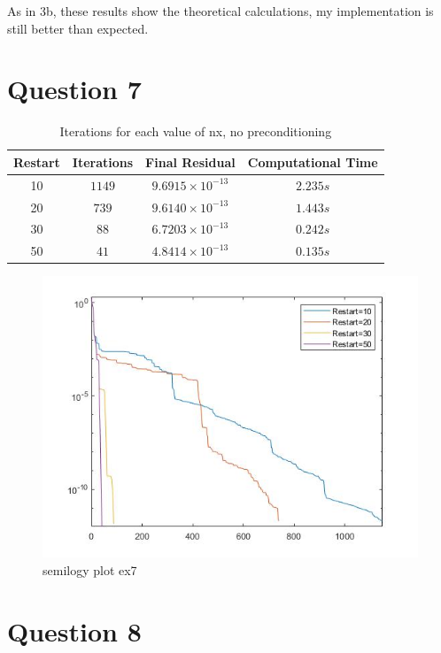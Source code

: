 \documentclass[a4paper, 11pt]{article}
\begin{document}
		As in 3b, these results show the theoretical calculations, my implementation is still better than expected.
		
		
		
		\section*{Question 7}
		
		\begin{table}[H]
			\centering
			\begin{tabular}{c|c|c|c}
				\textbf{Restart} &  \textbf{Iterations} 	& \textbf{Final Residual} 		& \textbf{Computational Time} 	\\ \hline
				10			& 			$1149$ 		& $ 9.6915 \times 10^{-13} $ 	& $ 2.235 s $	\\ \hline	
				20			& 			$739$		& $ 9.6140 \times 10^{-13} $	& $ 1.443 s $	\\ \hline
				30			& 			$88$ 		& $ 6.7203 \times 10^{-13} $ 	& $ 0.242 s $	\\ \hline	
				50			& 			$41$		& $ 4.8414 \times 10^{-13} $	& $ 0.135 s $	\\ \hline
			\end{tabular}
			\caption{Iterations for each value of nx, no preconditioning}
			\label{table:ex7}
		\end{table}
		
		\begin{figure}[H]
			\centering
			\includegraphics[width=.6\linewidth]{ex7.jpg}
			\caption{semilogy plot ex7}
			\label{fig:ex7}
		\end{figure}
	
		
		\section*{Question 8}
		
\end{document}
